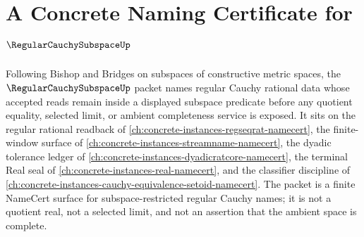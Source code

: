 \chapter{A Concrete Naming Certificate for $\RegularCauchySubspaceUp$}
\label{ch:concrete-instances-regular-cauchy-subspace-namecert}

Following Bishop and Bridges on subspaces of constructive metric spaces, the $\RegularCauchySubspaceUp$ packet names regular Cauchy rational data whose accepted reads remain inside a displayed subspace predicate before any quotient equality, selected limit, or ambient completeness service is exposed. It sits on the regular rational readback of \autoref{ch:concrete-instances-regseqrat-namecert}, the finite-window surface of \autoref{ch:concrete-instances-streamname-namecert}, the dyadic tolerance ledger of \autoref{ch:concrete-instances-dyadicratcore-namecert}, the terminal Real seal of \autoref{ch:concrete-instances-real-namecert}, and the classifier discipline of \autoref{ch:concrete-instances-cauchy-equivalence-setoid-namecert}. The packet is a finite NameCert surface for subspace-restricted regular Cauchy names; it is not a quotient real, not a selected limit, and not an assertion that the ambient space is complete.

